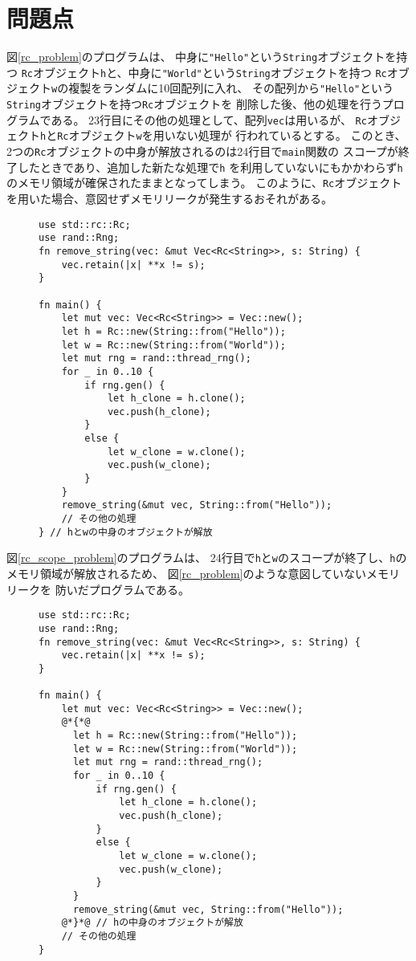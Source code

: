 \documentclass{sumiilab-paper}
\theoremstyle{mystyle}
\numberwithin{definition}{chapter} %
\begin{document}
\chapter{問題点}
図\ref{rc_problem}のプログラムは、
中身に\texttt{"Hello"}という\texttt{String}オブジェクトを持つ
\texttt{Rc}オブジェクト\texttt{h}と、中身に\texttt{"World"}という\texttt{String}オブジェクトを持つ
\texttt{Rc}オブジェクト\texttt{w}の複製をランダムに10回配列に入れ、
その配列から\texttt{"Hello"}という\texttt{String}オブジェクトを持つ\texttt{Rc}オブジェクトを
削除した後、他の処理を行うプログラムである。
23行目にその他の処理として、配列\texttt{vec}は用いるが、
\texttt{Rc}オブジェクト\texttt{h}と\texttt{Rc}オブジェクト\texttt{w}を用いない処理が
行われているとする。
このとき、2つの\texttt{Rc}オブジェクトの中身が解放されるのは24行目で\texttt{main}関数の
スコープが終了したときであり、追加した新たな処理で\texttt{h}
を利用していないにもかかわらず\texttt{h}のメモリ領域が確保されたままとなってしまう。
このように、\texttt{Rc}オブジェクトを用いた場合、意図せずメモリリークが発生するおそれがある。
\begin{figure}[htp]
\begin{lstlisting}[caption=Rcオブジェクトを利用する際の問題点, label=rc_problem, captionpos=b]
use std::rc::Rc;
use rand::Rng;
fn remove_string(vec: &mut Vec<Rc<String>>, s: String) {
    vec.retain(|x| **x != s);
}
  
fn main() {
    let mut vec: Vec<Rc<String>> = Vec::new();
    let h = Rc::new(String::from("Hello"));
    let w = Rc::new(String::from("World"));
    let mut rng = rand::thread_rng();
    for _ in 0..10 {
        if rng.gen() {
            let h_clone = h.clone();
            vec.push(h_clone);
        }
        else {
            let w_clone = w.clone();
            vec.push(w_clone);
        }
    }
    remove_string(&mut vec, String::from("Hello"));
    // その他の処理
} // hとwの中身のオブジェクトが解放
\end{lstlisting}
\end{figure}

図\ref{rc_scope_problem}のプログラムは、
24行目で\texttt{h}と\texttt{w}のスコープが終了し、\texttt{h}のメモリ領域が解放されるため、
図\ref{rc_problem}のような意図していないメモリリークを
防いだプログラムである。
\begin{figure}[htp]
\begin{lstlisting}[caption=メモリリークを防いだ例, 
  label=rc_scope_problem, captionpos=b]
use std::rc::Rc;
use rand::Rng;
fn remove_string(vec: &mut Vec<Rc<String>>, s: String) {
    vec.retain(|x| **x != s);
}
  
fn main() {
    let mut vec: Vec<Rc<String>> = Vec::new();
    @*{*@
      let h = Rc::new(String::from("Hello"));
      let w = Rc::new(String::from("World"));
      let mut rng = rand::thread_rng();
      for _ in 0..10 {
          if rng.gen() {
              let h_clone = h.clone();
              vec.push(h_clone);
          }
          else {
              let w_clone = w.clone();
              vec.push(w_clone);
          }
      } 
      remove_string(&mut vec, String::from("Hello"));
    @*}*@ // hの中身のオブジェクトが解放
    // その他の処理
}
\end{lstlisting}
\end{figure}
\end{document}
